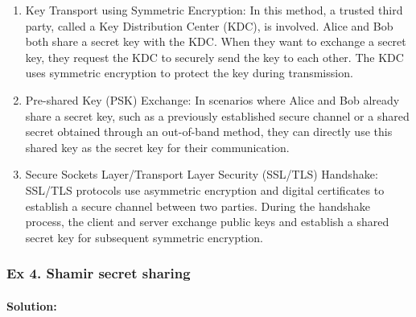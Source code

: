 {\begin{enumerate}
	\item 	    Key Transport using Symmetric Encryption: In this method, a trusted third party, called a Key Distribution Center (KDC), is involved. Alice and Bob both share a secret key with the KDC. When they want to exchange a secret key, they request the KDC to securely send the key to each other. The KDC uses symmetric encryption to protect the key during transmission.

	\item 	    Pre-shared Key (PSK) Exchange: In scenarios where Alice and Bob already share a secret key, such as a previously established secure channel or a shared secret obtained through an out-of-band method, they can directly use this shared key as the secret key for their communication.

	\item 	    Secure Sockets Layer/Transport Layer Security (SSL/TLS) Handshake: SSL/TLS protocols use asymmetric encryption and digital certificates to establish a secure channel between two parties. During the handshake process, the client and server exchange public keys and establish a shared secret key for subsequent symmetric encryption.
	\end{enumerate}}
	
	\subsubsection{Ex 4. Shamir secret sharing}
	
	\paragraph{Solution:}
	
